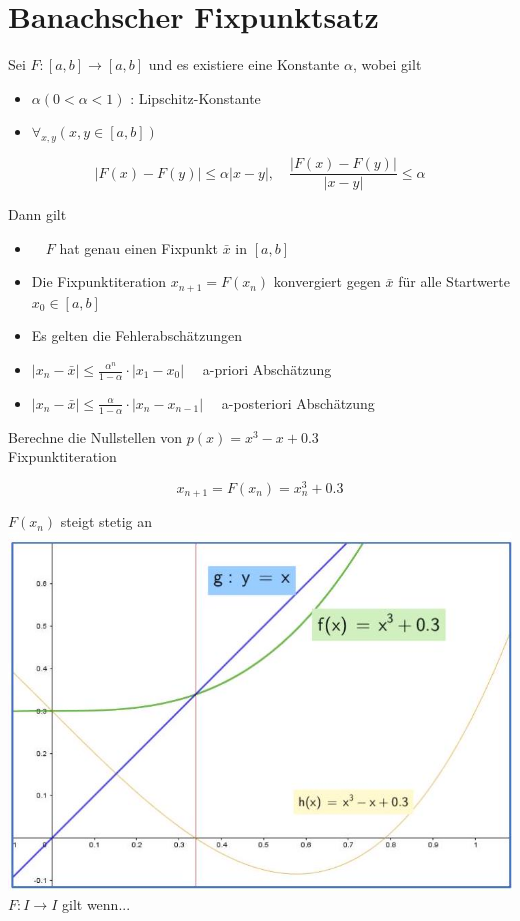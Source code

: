 \documentclass[10pt]{article}
\begin{document}
\section*{Banachscher Fixpunktsatz}
Sei $F:[a, b] \rightarrow[a, b]$ und es existiere eine Konstante $\alpha$, wobei gilt

\begin{itemize}
  \item $\alpha(0<\alpha<1)$ : Lipschitz-Konstante
  \item $\forall_{x, y}(x, y \in[a, b])$
\end{itemize}

$$
|F(x)-F(y)| \leq \alpha|x-y|, \quad \frac{|F(x)-F(y)|}{|x-y|} \leq \alpha
$$

Dann gilt

\begin{itemize}
  \item $\quad F$ hat genau einen Fixpunkt $\bar{x}$ in $[a, b]$
  \item Die Fixpunktiteration $x_{n+1}=F\left(x_{n}\right)$ konvergiert gegen $\bar{x}$ für alle Startwerte $x_{0} \in[a, b]$
  \item Es gelten die Fehlerabschätzungen
  \item $\left|x_{n}-\bar{x}\right| \leq \frac{\alpha^{n}}{1-\alpha} \cdot\left|x_{1}-x_{0}\right| \quad$ a-priori Abschätzung
  \item $\left|x_{n}-\bar{x}\right| \leq \frac{\alpha}{1-\alpha} \cdot\left|x_{n}-x_{n-1}\right| \quad$ a-posteriori Abschätzung
\end{itemize}

Berechne die Nullstellen von $p(x)=x^{3}-x+0.3$\\
Fixpunktiteration

$$
x_{n+1}=F\left(x_{n}\right)=x_{n}^{3}+0.3
$$

$F\left(x_{n}\right)$ steigt stetig an\\
\includegraphics[width=\linewidth]{images/2024_12_29_68ccba06d0091c162fa4g-02}\\
$F: I \rightarrow I$ gilt wenn...
\end{document}
